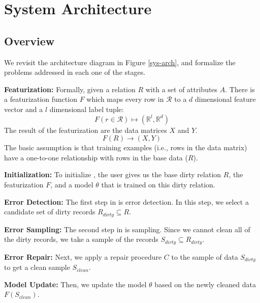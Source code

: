 \section{System Architecture}\label{arch}

\subsection{Overview}
We revisit the architecture diagram in Figure \ref{sys-arch}, and formalize
the problems addressed in each one of the stages.

\vspace{0.5em}

\textbf{Featurization: } Formally, given a relation $R$ with a set of attributes $A$.
There is a featurization function $F$ which maps every row in $\mathcal{R}$ to a $d$ dimensional feature vector and a $l$ dimensional label tuple: 
\[F(r \in \mathcal{R}) \mapsto (\mathbb{R}^l, \mathbb{R}^d)\]
The result of the featurization are the data matrices $X$ and $Y$.
\[
F(R)\rightarrow (X,Y)
\]
The basic assumption is that training examples (i.e., rows in the data matrix) have a one-to-one relationship with rows in the base data ($R$).

\vspace{0.5em}

\noindent\textbf{Initialization: } To initialize \sys, the user gives us the base dirty relation $R$, the featurization $F$, and a model $\theta$ that is trained on this dirty relation.

\vspace{0.5em}

\noindent\textbf{Error Detection: } The first step in \sys is error detection. In this step, we select a candidate set of dirty records $R_{dirty} \subseteq R$. 

\vspace{0.5em}

\noindent\textbf{Error Sampling: } The second step in \sys is sampling. Since we cannot clean all of the dirty records, we take a sample of the records $S_{dirty} \subseteq R_{dirty}$.

\vspace{0.5em}

\noindent\textbf{Error Repair: } Next, we apply a repair procedure $C$ to the sample of data $S_{dirty}$ to get a clean sample $S_{clean}$.

\vspace{0.5em}

\textbf{Model Update: } Then, we update the model $\theta$ based on the newly cleaned data $F(S_{clean})$.

